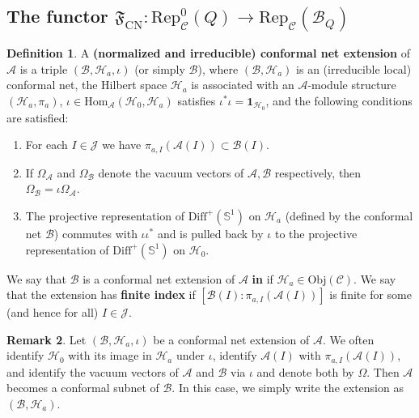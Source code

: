 \documentclass[11pt,b5paper,notitlepage]{article}
\theoremstyle{definition}
\newtheorem{df}{Definition}[section]
\newtheorem{rem}[df]{Remark}
\theoremstyle{plain}
\newcommand{\fk}{\mathfrak}
\newcommand{\mc}{\mathcal}
\newcommand{\idt}{\mathbf{1}}
\newcommand{\Hom}{\mathrm{Hom}}
\newcommand{\Rep}{\mathrm{Rep}}
\newcommand{\Diffp}{\mathrm{Diff}^+}
\newcommand{\scr}{\mathscr}
\newcommand{\Sbb}{{\mathbb S}}
\newcommand{\Obj}{\mathrm{Obj}}
\newcommand{\CN}{{\scriptscriptstyle \mathrm{CN}}}
\numberwithin{equation}{section}
\begin{document}
\subsection{The functor $\fk F_\CN:\Rep^0_{\scr C}(Q)\rightarrow\Rep_{\scr C}(\mc B_Q)$}

\begin{df}
A \textbf{(normalized and irreducible) conformal net extension} of $\mc A$ is a triple $(\mc B,\mc H_a,\iota)$ (or simply $\mc B$), where $(\mc B,\mc H_a)$ is an (irreducible local) conformal net, the Hilbert space $\mc H_a$ is associated with an $\mc A$-module structure $(\mc H_a,\pi_a)$,  $\iota\in\Hom_{\mc A}(\mc H_0,\mc H_a)$ satisfies $\iota^*\iota=\idt_{\mc H_0}$, and the following conditions are satisfied:
\begin{enumerate}[label=(\arabic*)]
\item For each $I\in\mc J$ we have $\pi_{a,I}(\mc A(I))\subset\mc B(I)$.
\item If $\Omega_{\mc A}$ and $\Omega_{\mc B}$ denote the vacuum vectors of $\mc A,\mc B$ respectively, then $\Omega_{\mc B}=\iota\Omega_{\mc A}$.
\item The projective representation of $\Diffp(\Sbb^1)$ on $\mc H_a$ (defined by the conformal net $\mc B$) commutes with $\iota\iota^*$ and is pulled back by $\iota$ to the projective representation of $\Diffp(\Sbb^1)$ on $\mc H_0$.
\end{enumerate}
We say that $\mc B$ is a conformal net extension of $\mc A$ \textbf{in} \pmb{$\scr C$} if $\mc H_a\in\Obj(\scr C)$. We say that the extension has \textbf{finite index} if $[\mc B(I):\pi_{a,I}(\mc A(I))]$ is finite for some (and hence for all) $I\in\mc J$.
\end{df}


\begin{rem}
Let $(\mc B,\mc H_a,\iota)$ be a conformal net extension of $\mc A$. We often identify $\mc H_0$ with its image in $\mc H_a$ under $\iota$, identify $\mc A(I)$ with $\pi_{a,I}(\mc A(I))$, and identify the vacuum vectors of $\mc A$ and $\mc B$ via $\iota$ and denote both by $\Omega$. Then $\mc A$ becomes a conformal subnet of $\mc B$. In this case, we simply write the extension as $(\mc B, \mc H_a)$.
\end{rem}
\end{document}
